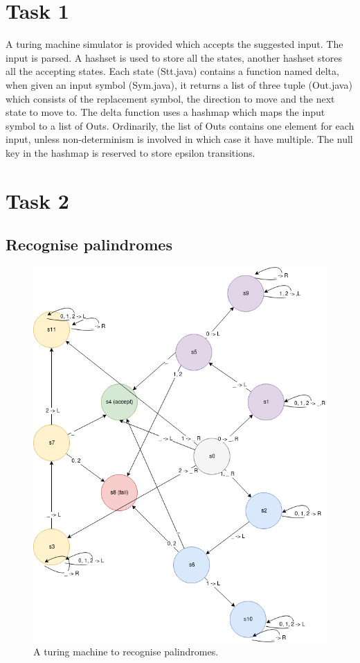 \documentclass{article}
\begin{document}
\section{Task 1}

A turing machine simulator is provided which accepts the suggested input. The input is parsed. A hashset is used to store all the states, another hashset stores all the accepting states. Each state (Stt.java) contains a function named delta, when given an input symbol (Sym.java), it returns a list of three tuple (Out.java) which consists of the replacement symbol, the direction to move and the next state to move to. The delta function uses a hashmap which maps the input symbol to a list of Outs. Ordinarily, the list of Outs contains one element for each input, unless non-determinism is involved in which case it have multiple. The null key in the hashmap is reserved to store epsilon transitions.

\section{Task 2}

\subsection{Recognise palindromes}

\begin{figure}[!htb]
  \caption{A turing machine to recognise palindromes.}
  \centering
  \includegraphics[scale=0.30]{images/palindrome.png}
\end{figure}
\end{document}

